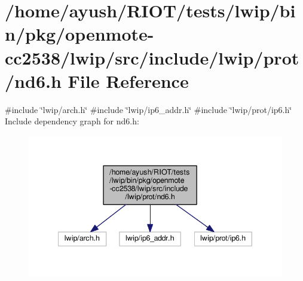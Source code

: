 \hypertarget{openmote-cc2538_2lwip_2src_2include_2lwip_2prot_2nd6_8h}{}\section{/home/ayush/\+R\+I\+O\+T/tests/lwip/bin/pkg/openmote-\/cc2538/lwip/src/include/lwip/prot/nd6.h File Reference}
\label{openmote-cc2538_2lwip_2src_2include_2lwip_2prot_2nd6_8h}
{\ttfamily \#include \char`\"{}lwip/arch.\+h\char`\"{}}\newline
{\ttfamily \#include \char`\"{}lwip/ip6\+\_\+addr.\+h\char`\"{}}\newline
{\ttfamily \#include \char`\"{}lwip/prot/ip6.\+h\char`\"{}}\newline
Include dependency graph for nd6.\+h\+:
\nopagebreak
\begin{figure}[H]
\begin{center}
\leavevmode
\includegraphics[width=340pt]{openmote-cc2538_2lwip_2src_2include_2lwip_2prot_2nd6_8h__incl}
\end{center}
\end{figure}
